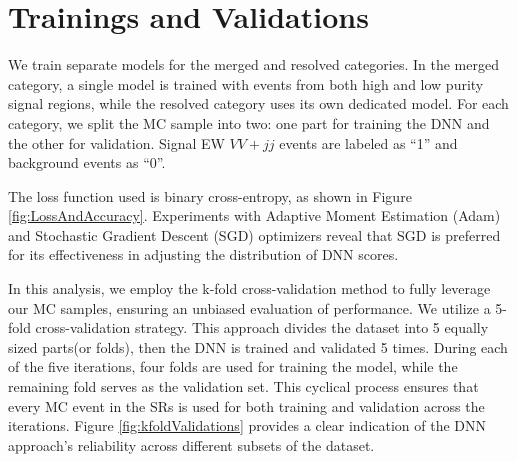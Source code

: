 \clearpage
\section{Trainings and Validations}
\label{trainings_and_validations}



We train separate models for the merged and resolved categories. In the merged category, a single model is trained with events from both high and low purity signal regions, while the resolved category uses its own dedicated model. For each category, we split the MC sample into two: one part for training the DNN and the other for validation. Signal EW $VV+jj$ events are labeled as ``1'' and background events as ``0''.

The loss function used is binary cross-entropy, as shown in Figure \ref{fig:LossAndAccuracy}. Experiments with Adaptive Moment Estimation (Adam) and Stochastic Gradient Descent (SGD) optimizers reveal that SGD is preferred for its effectiveness in adjusting the distribution of DNN scores.

In this analysis, we employ the k-fold cross-validation method to fully leverage our MC samples, ensuring an unbiased evaluation of performance. 
We utilize a 5-fold cross-validation strategy. This approach divides the dataset into 5 equally sized parts(or folds), then the DNN is trained and validated 5 times. 
During each of the five iterations, four folds are used for training the model, while the remaining fold serves as the validation set. 
This cyclical process ensures that every MC event in the SRs is used for both training and validation across the iterations.
Figure \ref{fig:kfoldValidations} provides a clear indication of the DNN approach's reliability across different subsets of the dataset.

